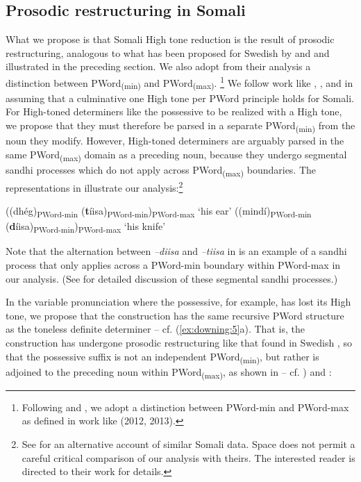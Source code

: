 \documentclass[output=paper]{langscibook}
\begin{document}
\subsection{Prosodic restructuring in Somali}

What we propose is that Somali High tone reduction is the result of prosodic restructuring, analogous to what has been proposed for Swedish by \citet{Myrberg2015} and \citet{Riad2016} and illustrated in the preceding section. We also adopt from their analysis a distinction between PWord\textsubscript{(min)} and PWord\textsubscript{(max)}.{} \footnote{Following \citet{Myrberg2015} and \citet{Riad2016}, we adopt a distinction between PWord-min and PWord-max as defined in work like \citet{Ito2012, Ito2013} (2012, 2013).} We follow work like \citet{Green2016}, \citet{Hyman1981,Hyman2006, Hyman2012}, \citet{LeGac2003} and \citet{Saeed2004} in assuming that a culminative one High tone per PWord principle holds for Somali. For High-toned determiners like the possessive to be realized with a High tone, we propose that they must therefore be parsed in a separate PWord\textsubscript{(min)} from the noun they modify. However, High-toned determiners are arguably parsed in the same PWord\textsubscript{(max)} domain as a preceding noun, because they undergo segmental sandhi processes which do not apply across PWord\textsubscript{(max)} boundaries. The representations in  illustrate our analysis:\footnote{See \citet{Green2016} for an alternative account of similar Somali data. Space does not permit a careful critical comparison of our analysis with theirs. The interested reader is directed to their work for details.}

\ea \label{ex:downing:18}
\ea ((dhég)\textsubscript{PWord-min} (\textbf{t}íisa)\textsubscript{PWord-min})\textsubscript{PWord-max}   ‘his ear’ \label{ex:downing:18a}
\ex ((mindí)\textsubscript{PWord-min} (\textbf{d}íisa)\textsubscript{PWord-min})\textsubscript{PWord-max} ‘his knife’ \label{ex:downing:18b}
\z
\z

Note that the alternation between \textit{–diisa} and \textit{–tiisa} in  is an example of a sandhi process that only applies across a PWord-min boundary within PWord-max in our analysis. (See \citet[28--31]{Saeed1999} for detailed discussion of these segmental sandhi processes.)

In the variable pronunciation where the possessive, for example, has lost its High tone, we propose that the construction has the same recursive PWord structure as the toneless definite determiner – cf. (\ref{ex:downing:5}a). That is, the construction has undergone prosodic restructuring like that found in Swedish , so that the possessive suffix is not an independent PWord\textsubscript{(min)}, but rather is adjoined to the preceding noun within PWord\textsubscript{(max)}, as shown in  – cf.  ) and :
\end{document}
